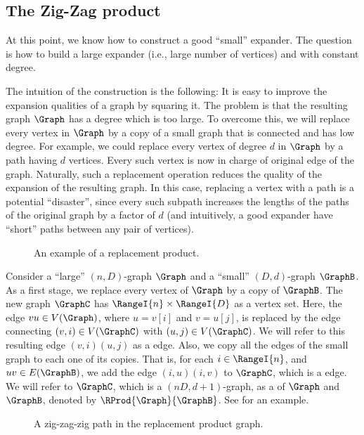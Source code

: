 \subsection{The Zig-Zag product}

At this point, we know how to construct a good ``small'' expander. The
question is how to build a large expander (i.e., large number of
vertices) and with constant degree.

The intuition of the construction is the following: It is easy to
improve the expansion qualities of a graph by squaring it. The problem
is that the resulting graph $\Graph$ has a degree which is too
large. To overcome this, we will replace every vertex in $\Graph$ by a
copy of a small graph that is connected and has low degree. For
example, we could replace every vertex of degree $d$ in $\Graph$ by a
path having $d$ vertices. Every such vertex is now in charge of
original edge of the graph. Naturally, such a replacement operation
reduces the quality of the expansion of the resulting graph. In this
case, replacing a vertex with a path is a potential ``disaster'',
since every such subpath increases the lengths of the paths of the
original graph by a factor of $d$ (and intuitively, a good expander
have ``short'' paths between any pair of vertices).

\begin{figure}[t]
    \centering
    \caption{An example of a replacement product.}
\end{figure}


Consider a ``large'' $(n,D)$-graph $\Graph$ and a ``small''
$(D,d)$-graph $\GraphB$. As a first stage, we replace every vertex of
$\Graph$ by a copy of $\GraphB$.  The new graph $\GraphC$ has
$\RangeI{n}\times\RangeI{D}$ as a vertex set.  Here, the edge $v u \in
V(\Graph)$, where $u=v[i]$ and $v=u[j]$, is replaced by the edge
connecting $(v,i) \in V(\GraphC)$ with $(u,j) \in V(\GraphC)$. We will
refer to this resulting edge $(v,i)(u,j)$ as a 
edge. Also, we copy all the edges of the small graph to each one of
its copies. That is, for each $i\in \RangeI{n}$, and $uv \in
E(\GraphB)$, we add the edge $(i,u) (i,v)$ to $\GraphC$, which is a
 edge. We will refer to $\GraphC$, which is a $(nD,
d+1)$-graph, as a  of $\Graph$ and
$\GraphB$, denoted by $\RProd{\Graph}{\GraphB}$. See 
for an example.

\begin{figure}[t]
    \centering
    \caption{A zig-zag-zig path in the replacement product graph.}
\end{figure}

